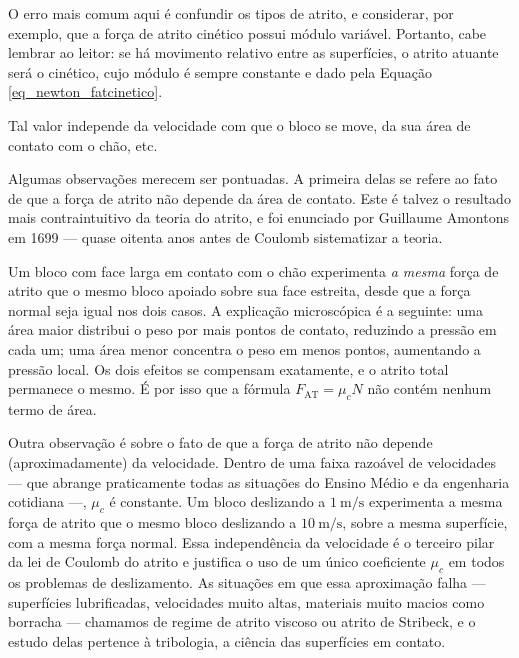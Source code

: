








O erro mais comum aqui é confundir os tipos de atrito, e considerar, por exemplo, que a força de atrito cinético possui módulo variável. Portanto, cabe lembrar ao leitor: se há movimento relativo entre as superfícies, o atrito atuante será o cinético, cujo módulo é sempre constante e dado pela Equação \eqref{eq_newton_fatcinetico}. 

Tal valor independe da velocidade com que o bloco se move, da sua área de contato com o chão, etc.



Algumas observações merecem ser pontuadas. A primeira delas se refere ao fato de que a força de atrito não depende da área de contato. Este é talvez o resultado mais contraintuitivo da teoria do atrito, e foi enunciado por Guillaume Amontons em 1699 — quase oitenta anos
antes de Coulomb sistematizar a teoria.

Um bloco com face larga em contato com o chão experimenta
\emph{a mesma} força de atrito que o mesmo bloco apoiado sobre sua
face estreita, desde que a força normal seja igual nos dois casos.
A explicação microscópica é a seguinte: uma área maior distribui o
peso por mais pontos de contato, reduzindo a pressão em cada um;
uma área menor concentra o peso em menos pontos, aumentando a pressão
local.
Os dois efeitos se compensam exatamente, e o atrito total permanece
o mesmo. É por isso que a fórmula $F_\text{AT} = \mu_c N$ não contém nenhum
termo de área.

Outra observação é sobre o fato de que a força de atrito não depende (aproximadamente) da velocidade.
Dentro de uma faixa razoável de velocidades — que abrange praticamente
todas as situações do Ensino Médio e da engenharia cotidiana —,
$\mu_c$ é constante.
Um bloco deslizando a $1\ \text{m/s}$ experimenta a mesma força de
atrito que o mesmo bloco deslizando a $10\ \text{m/s}$, sobre a mesma
superfície, com a mesma força normal.
Essa independência da velocidade é o terceiro pilar da lei de Coulomb
do atrito e justifica o uso de um único coeficiente $\mu_c$ em todos
os problemas de deslizamento.
As situações em que essa aproximação falha — superfícies lubrificadas,
velocidades muito altas, materiais muito macios como borracha —
chamamos de regime de atrito viscoso ou atrito de Stribeck,
e o estudo delas pertence à tribologia, a ciência das superfícies
em contato.

